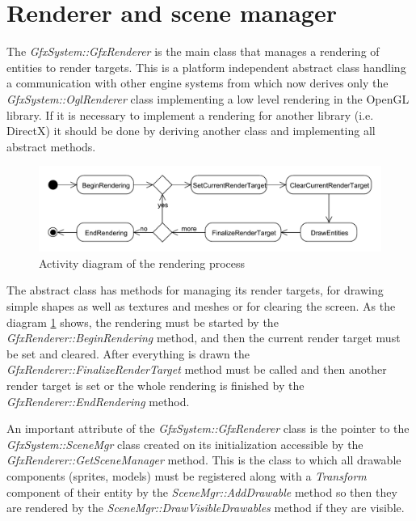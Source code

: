 \documentclass[a4paper, 12pt]{report}
\begin{document}
\section{Renderer and scene manager}

The \emph{GfxSystem::GfxRenderer} is the main class that manages a rendering of entities to render targets. This is a platform independent abstract class handling a communication with other engine systems from which now derives only the \emph{GfxSystem::OglRenderer} class implementing a low level rendering in the OpenGL library\cite{opengl}. If it is necessary to implement a rendering for another library (i.e. DirectX) it should be done by deriving another class and implementing all abstract methods.

\begin{figure}[htbp]
	\centering
		\includegraphics[width=1\textwidth]{RenderingActivityDiagram.pdf}
	\caption{Activity diagram of the rendering process}
	\label{fig:rendering-diagram}
\end{figure}

The abstract class has methods for managing its render targets, for drawing simple shapes as well as textures and meshes or for clearing the screen. As the diagram \ref{fig:rendering-diagram} shows, the rendering must be started by the \emph{GfxRenderer::BeginRendering} method, and then the current render target must be set and cleared. After everything is drawn the \emph{GfxRenderer\-::Finalize\-Render\-Target} method must be called and then another render target is set or the whole rendering is finished by the \emph{GfxRenderer::EndRendering} method.

An important attribute of the \emph{GfxSystem::GfxRenderer} class is the point\-er to the \emph{GfxSystem::SceneMgr} class created on its initialization accessible by the \emph{GfxRenderer::GetSceneManager} method. This is the class to which all drawable components (sprites, models) must be registered along with a \emph{Transform} component of their entity by the \emph{SceneMgr::AddDrawable} method so then they are rendered by the \emph{SceneMgr::DrawVisibleDrawables} method if they are visible.
\end{document}
